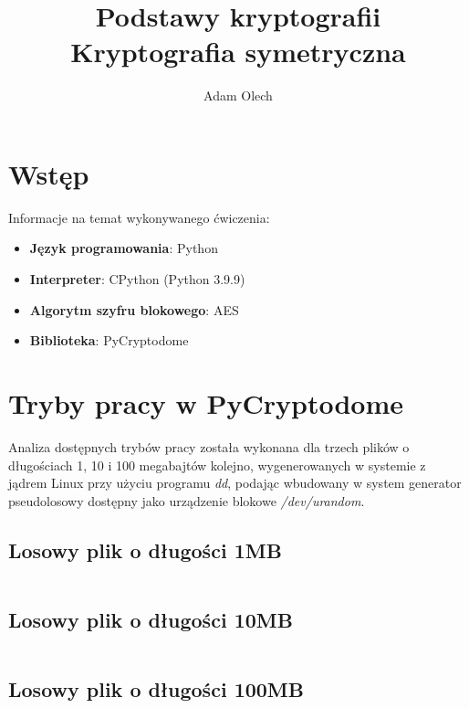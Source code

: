 \documentclass[12pt]{article}
\title{Podstawy kryptografii \\ \large Kryptografia symetryczna}
\author{Adam Olech}
\newenvironment*{dummyenv}{}{}
\begin{document}
\maketitle

\tableofcontents
\newpage

\section{Wstęp}

Informacje na temat wykonywanego ćwiczenia:

\begin{itemize}
	\item \textbf{Język programowania}: Python
	\item \textbf{Interpreter}: CPython (Python 3.9.9)
	\item \textbf{Algorytm szyfru blokowego}: AES
	\item \textbf{Biblioteka}: PyCryptodome
\end{itemize}

\section{Tryby pracy w PyCryptodome}

Analiza dostępnych trybów pracy została wykonana dla trzech plików o długościach
1, 10 i 100 megabajtów kolejno,
wygenerowanych w systemie z jądrem Linux przy użyciu programu \textit{dd},
podając wbudowany w system generator pseudolosowy dostępny jako urządzenie blokowe \textit{/dev/urandom}.

\subsection{Losowy plik o długości 1MB}

\begin{dummyenv}
	\inputminted[firstline=2,lastline=91]{yaml}{2-enc-dec-time.txt}
\end{dummyenv}

\subsection{Losowy plik o długości 10MB}

\begin{dummyenv}
	\inputminted[firstline=92,lastline=181]{yaml}{2-enc-dec-time.txt}
\end{dummyenv}

\subsection{Losowy plik o długości 100MB}
\end{document}
